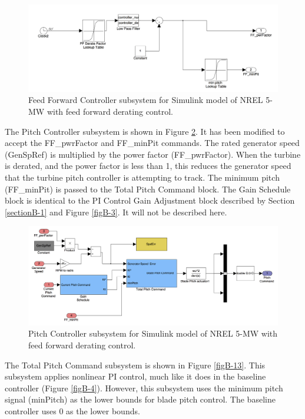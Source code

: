 \begin{figure}[ht]
	\centering
		\includegraphics[width=\linewidth]{Figures/AppendixBFigures/FF_Derate2.png}
	\caption{Feed Forward Controller subsystem for Simulink model of NREL 5-MW with feed forward derating control.}
	\label{figB-11}
\end{figure}

The Pitch Controller subsystem is shown in Figure \ref{figB-12}. It has been modified to accept the FF\_pwrFactor and FF\_minPit commands. The rated generator speed (GenSpRef) is multiplied by the power factor (FF\_pwrFactor). When the turbine is derated, and the power factor is less than 1, this reduces the generator speed that the turbine pitch controller is attempting to track. The minimum pitch (FF\_minPit) is passed to the Total Pitch Command block. The Gain Schedule block is identical to the PI Control Gain Adjustment block described by Section \ref{sectionB-1} and Figure \ref{figB-3}. It will not be described here. 

\begin{figure}[ht]
	\centering
		\includegraphics[width=\linewidth]{Figures/AppendixBFigures/FF_Derate3.png}
	\caption{Pitch Controller subsystem for Simulink model of NREL 5-MW with feed forward derating control.}
	\label{figB-12}
\end{figure}

The Total Pitch Command subsystem is shown in Figure \ref{figB-13}. This subsystem applies nonlinear PI control, much like it does in the baseline controller (Figure \ref{figB-4}). However, this subsystem uses the minimum pitch signal (minPitch)  as the lower bounds for blade pitch control. The baseline controller uses 0\degree{} as the lower bounds.

